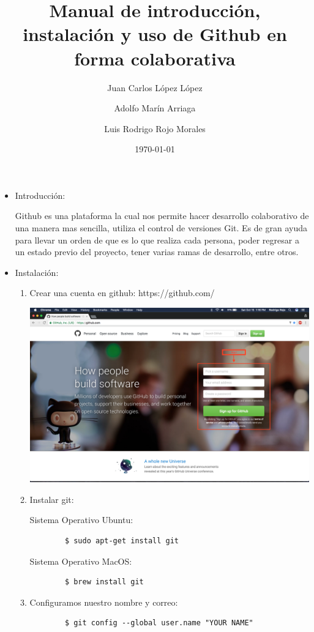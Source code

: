 \documentclass{article}
\title{Manual	 de	 introducción,	 instalación	 y	 uso	 de	 Github	 en	 forma	 colaborativa}
\author{Juan Carlos López López \and Adolfo Marín Arriaga \and Luis Rodrigo Rojo Morales}
\date{\today\\}
\begin{document}
 \maketitle



 \begin{itemize}

   \item Introducción:

    Github es una plataforma la cual nos permite hacer desarrollo colaborativo de una manera mas sencilla, utiliza el control de versiones Git. Es de gran ayuda para llevar un orden de que es lo que realiza cada persona, poder regresar a un estado previo del proyecto, tener varias ramas de desarrollo, entre otros.
   \item Instalación:
    \begin{enumerate}
      \item Crear una cuenta en github: https://github.com/


      \includegraphics[scale=0.3]{1}

      \item Instalar git:

      Sistema Operativo Ubuntu:
      \begin{verbatim}
        $ sudo apt-get install git
      \end{verbatim}
      Sistema Operativo MacOS:
      \begin{verbatim}
        $ brew install git
      \end{verbatim}

      \item{Configuramos nuestro nombre y correo:}
      \begin{verbatim}
        $ git config --global user.name "YOUR NAME"


\end{verbatim}
\end{enumerate}
\end{itemize}
\end{document}
